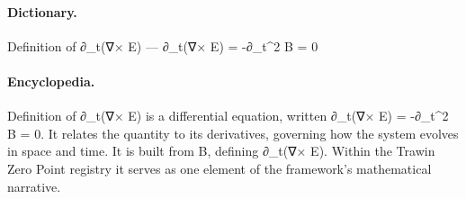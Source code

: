 \paragraph{Dictionary.}
Definition of ∂\_t(∇× E) — ∂\_t(∇× E) = -∂\_t\textasciicircum{}2 B = 0

\paragraph{Encyclopedia.}
Definition of ∂\_t(∇× E) is a differential equation, written ∂\_t(∇× E) = -∂\_t\textasciicircum{}2 B = 0. It relates the quantity to its derivatives, governing how the system evolves in space and time. It is built from B, defining ∂\_t(∇× E). Within the Trawin Zero Point registry it serves as one element of the framework's mathematical narrative.
